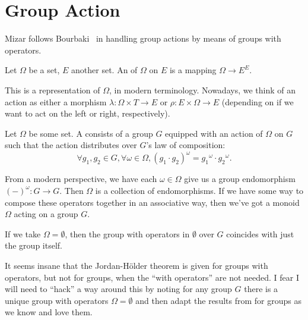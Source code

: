 \section{Group Action}

Mizar follows Bourbaki~\cite{bourbaki1974elements} in handling group
actions by means of groups with operators.

\begin{definition}
Let $\Omega$ be a set, $E$ another set. An  of $\Omega$
on $E$ is a mapping $\Omega\to E^{E}$.
\end{definition}

This is a representation of $\Omega$, in modern terminology. Nowadays,
we think of an action as either a morphism $\lambda\colon\Omega\times T\to E$
or $\rho\colon E\times\Omega\to E$ (depending on if we want to act on
the left or right, respectively).

\begin{definition}
Let $\Omega$ be some set. A 
consists of a group $G$ equipped with an action of $\Omega$ on $G$ such
that the action distributes over $G$'s law of composition:
\begin{equation}
  \forall g_{1},g_{2}\in G,\forall\omega\in\Omega,
  (g_{1}\cdot g_{2})^{\omega} = {g_{1}}^{\omega}\cdot{g_{2}}^{\omega}.
\end{equation}
\end{definition}

\begin{def-remark}
From a modern perspective, we have each $\omega\in\Omega$ give us a
group endomorphism $(-)^{\omega}\colon G\to G$. Then $\Omega$ is a
collection of endomorphisms. If we have some way to compose these
operators together in an associative way, then we've got a monoid
$\Omega$ acting on a group $G$.
\end{def-remark}

\begin{def-remark}
If we take $\Omega=\emptyset$, then the group with operators in
$\emptyset$ over $G$ coincides with just the group itself.
\end{def-remark}

\begin{def-remark}
It seems insane that the Jordan-H\"older theorem is given for groups
with operators, but not for groups, when the ``with operators'' are not
needed. I fear I will need to ``hack'' a way around this by noting for
any group $G$ there is a unique group with operators $\Omega=\emptyset$
and then adapt the results from  for groups as we know and
love them.
\end{def-remark}

